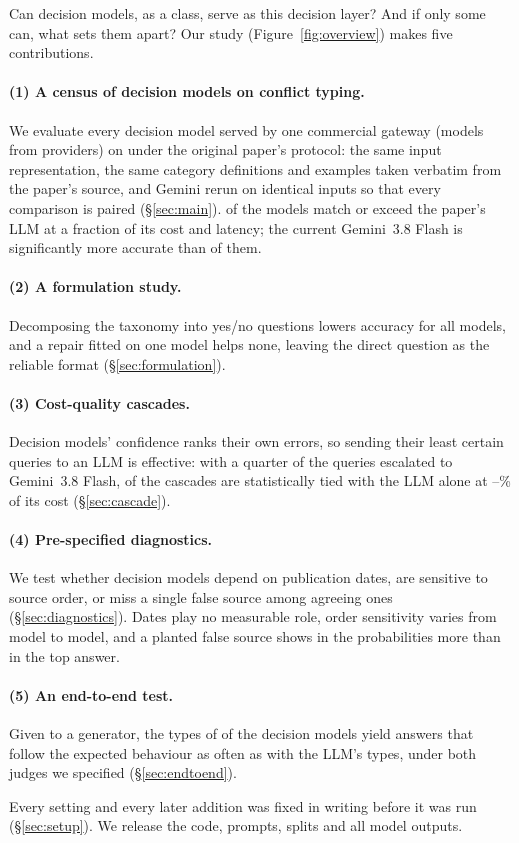 Can decision models, as a class, serve as this decision layer? And if only some can, what sets them apart? Our
study (Figure~\ref{fig:overview}) makes five contributions.

\paragraph{(1) A census of decision models on conflict typing.} We evaluate every decision model served by one
commercial gateway (\ndm models from \nproviders providers) on \conflicts under the original paper's protocol: the
same input representation, the same category definitions and examples taken verbatim from the paper's source, and
Gemini rerun on identical inputs so that every comparison is paired (\S\ref{sec:main}). \natpar of the \ndm
models match or exceed the paper's LLM at a fraction of its cost and latency; the current Gemini~3.8 Flash is
significantly more accurate than \nworsenow of them.

\paragraph{(2) A formulation study.} Decomposing the taxonomy into yes/no questions lowers accuracy for all \ndm
models, and a repair fitted on one model helps none, leaving the direct question as the reliable format
(\S\ref{sec:formulation}).

\paragraph{(3) Cost-quality cascades.} Decision models' confidence ranks their own errors, so sending their least
certain queries to an LLM is effective: with a quarter of the queries escalated to Gemini~3.8 Flash, \ncasctied of
the \ndm cascades are statistically tied with the LLM alone at \casctiedcostmin--\casctiedcostmax\% of its cost
(\S\ref{sec:cascade}).

\paragraph{(4) Pre-specified diagnostics.} We test whether decision models depend on publication dates,
are sensitive to source order, or miss a single false source among agreeing ones (\S\ref{sec:diagnostics}). Dates
play no measurable role, order sensitivity varies from model to model, and a planted false source shows in the
probabilities more than in the top answer.

\paragraph{(5) An end-to-end test.} Given to a generator, the types of \eentied of the \ndm decision models yield
answers that follow the expected behaviour as often as with the LLM's types, under both judges we specified
(\S\ref{sec:endtoend}).

Every setting and every later addition was fixed in writing before it was run (\S\ref{sec:setup}). We release the
code, prompts, splits and all model outputs\releasenote.
